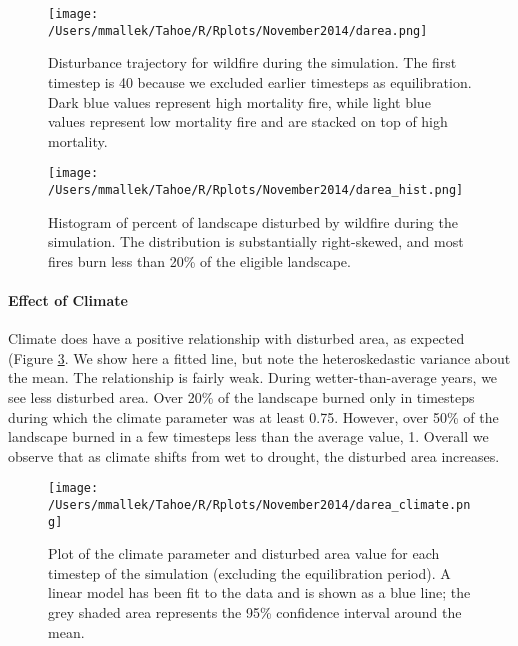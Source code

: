 
\begin{figure}[!htbp]
\centering
\texttt{[image: /Users/mmallek/Tahoe/R/Rplots/November2014/darea.png]}
\caption{Disturbance trajectory for wildfire during the simulation. The first timestep is 40 because we excluded earlier timesteps as equilibration. Dark blue values represent high mortality fire, while light blue values represent low mortality fire and are stacked on top of high mortality.}
\label{darea}
\end{figure}

\begin{figure}[!htbp]
\centering
\texttt{[image: /Users/mmallek/Tahoe/R/Rplots/November2014/darea\_hist.png]}
\caption{Histogram of percent of landscape disturbed by wildfire during the simulation. The distribution is substantially right-skewed, and most fires burn less than 20\% of the eligible landscape.}
\label{fig:darea_hist}
\end{figure}

\paragraph{Effect of Climate} Climate does have a positive relationship with disturbed area, as expected (Figure \ref{fig:darea_climate}. We show here a fitted line, but note the heteroskedastic variance about the mean. The relationship is fairly weak. During wetter-than-average years, we see less disturbed area. Over 20\% of the landscape burned only in timesteps during which the climate parameter was at least 0.75. However, over 50\% of the landscape burned in a few timesteps less than the average value, 1. Overall we observe that as climate shifts from wet to drought, the disturbed area increases.

\begin{figure}[!htbp]
\centering
\texttt{[image: /Users/mmallek/Tahoe/R/Rplots/November2014/darea\_climate.png]}
\caption{Plot of the climate parameter and disturbed area value for each timestep of the simulation (excluding the equilibration period). A linear model has been fit to the data and is shown as a blue line; the grey shaded area represents the 95\% confidence interval around the mean.}
\label{fig:darea_climate}
\end{figure}

